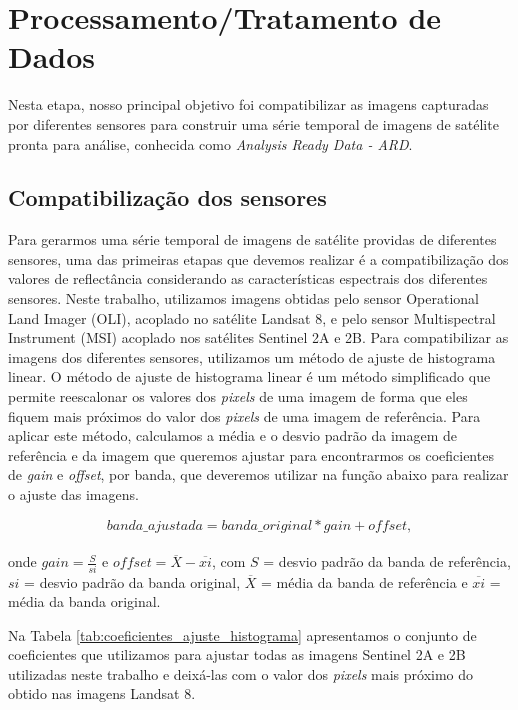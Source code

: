 \chapter{Processamento/Tratamento de Dados}

Nesta etapa, nosso principal objetivo foi compatibilizar as imagens capturadas por diferentes sensores para construir uma série temporal de imagens de satélite pronta para análise, conhecida como \textit{Analysis Ready Data - ARD}. 

\section{Compatibilização dos sensores}

Para gerarmos uma série temporal de imagens de satélite providas de diferentes sensores, uma das primeiras etapas que devemos realizar é a compatibilização dos valores de reflectância considerando as características espectrais dos diferentes sensores. Neste trabalho, utilizamos imagens obtidas pelo sensor Operational Land Imager (OLI), acoplado no satélite Landsat 8, e pelo sensor Multispectral Instrument (MSI) acoplado nos satélites Sentinel 2A e 2B. Para compatibilizar as imagens dos diferentes sensores, utilizamos um método de ajuste de histograma linear. O método de ajuste de histograma linear é um método simplificado que permite reescalonar os valores dos \textit{pixels} de uma imagem de forma que eles fiquem mais próximos do valor dos \textit{pixels} de uma imagem de referência. Para aplicar este método, calculamos a média e o desvio padrão da imagem de referência e da imagem que queremos ajustar para encontrarmos os coeficientes de \textit{gain} e \textit{offset}, por banda, que deveremos utilizar na função abaixo para realizar o ajuste das imagens. 

\begin{equation}
banda\_ajustada = banda\_original * gain + offset,
\end{equation} \\ onde  $gain=  \frac{S}{si} $ e $offset = \overline{X} - \overline{xi}$, com $S$ = desvio padrão da banda de referência, $si$ = desvio padrão da banda original, $ \overline{X}$ = média da banda de referência e $\overline{xi}$ = média da banda original. 

Na Tabela \ref{tab:coeficientes_ajuste_histograma} apresentamos o conjunto de coeficientes que utilizamos para ajustar todas as imagens Sentinel 2A e 2B utilizadas neste trabalho e deixá-las com o valor dos \textit{pixels} mais próximo do obtido nas imagens Landsat 8.   

